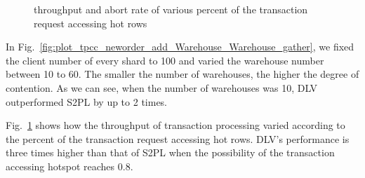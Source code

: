 \documentclass[conference]{IEEEtran}
\begin{document}
\begin{figure}[tbp]
  \centering
\caption{throughput and abort rate of various percent of the transaction request accessing hot rows}
\label{fig:plot_tpcc_neworder_add_HotItem_HotItem_gather}
\end{figure}

In Fig.~\ref{fig:plot_tpcc_neworder_add_Warehouse_Warehouse_gather}, we fixed the client number of every shard to 100 and varied the warehouse number between 10 to 60.
The smaller the number of warehouses, the higher the degree of contention.
As we can see, when the number of warehouses was 10, DLV outperformed S2PL by up to 2 times.

Fig.~\ref{fig:plot_tpcc_neworder_add_HotItem_HotItem_gather} shows how the throughput of transaction processing varied according to the percent of the transaction request accessing hot rows.
DLV's performance is three times higher than that of S2PL when the possibility of the transaction accessing hotspot reaches 0.8.
\end{document}
